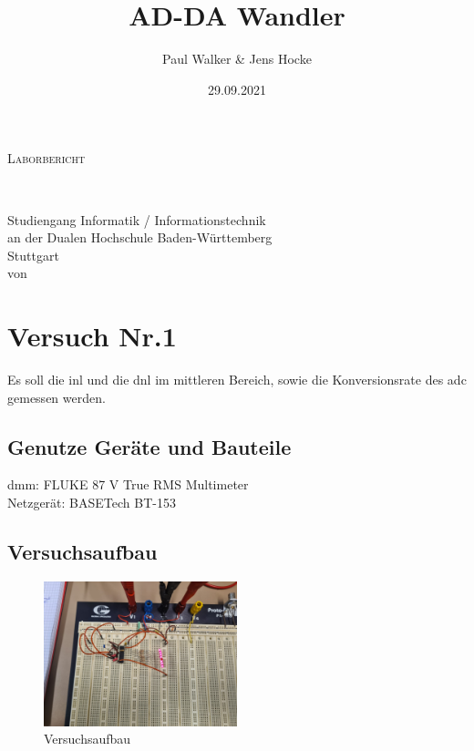 \documentclass[12pt, a4paper, ngerman]{article}
\title{AD-DA Wandler}
\author{Paul Walker \& Jens Hocke}
\date{29.09.2021}
\newcommand{\Was}{Laborbericht}
\newcommand{\Studiengang}{Informatik / Informationstechnik}
\begin{document}
\makeatletter
\begin{titlepage}
  \begin{center}
    \vspace*{1cm}
    {\Huge\scshape \Was}\\[2cm]
    \begin{center}
      \linespread{1}\Huge \@title\\[2cm]
    \end{center}
    {\large Studiengang \Studiengang}\\
    {\large an der Dualen Hochschule Baden-Württemberg\\ Stuttgart}\\[2cm]
    {\large von}\\
    {\large\bfseries \@author}
    \vfill
  \end{center}
\end{titlepage}
\makeatother

\tableofcontents

\newpage
\thispagestyle{simple}
\printacronyms[name=Abkürzungsverzeichnis, heading=section*]
\newpage

\section{Versuch Nr.1}

Es soll die \ac{inl} und die \ac{dnl} im mittleren Bereich,
sowie die Konversionsrate des \ac{adc} gemessen werden.

\subsection{Genutze Geräte und Bauteile}

\ac{dmm}: FLUKE 87 V True RMS Multimeter \\
Netzgerät: BASETech BT-153 \\


\subsection{Versuchsaufbau}

\begin{figure}%
  \centering
  \includegraphics[width=0.5\textwidth]{versuch_1_versuchsaufbau.jpeg}
  \caption{Versuchsaufbau}
  \label{abb:aufbau1}
\end{figure}
\end{document}
